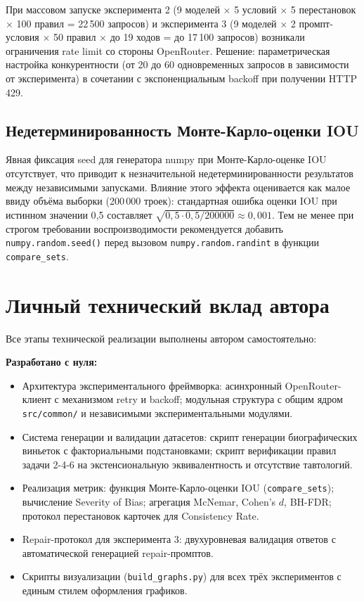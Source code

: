 При массовом запуске эксперимента 2 (9 моделей $\times$ 5 условий $\times$ 5 перестановок $\times$ 100 правил = 22\,500 запросов) и эксперимента 3 (9 моделей $\times$ 2 промпт-условия $\times$ 50 правил $\times$ до 19 ходов = до 17\,100 запросов) возникали ограничения rate limit со стороны OpenRouter. Решение: параметрическая настройка конкурентности (от 20 до 60 одновременных запросов в зависимости от эксперимента) в сочетании с экспоненциальным backoff при получении HTTP 429.

\subsection{Недетерминированность Монте-Карло-оценки IOU}

Явная фиксация seed для генератора numpy при Монте-Карло-оценке IOU отсутствует, что приводит к незначительной недетерминированности результатов между независимыми запусками. Влияние этого эффекта оценивается как малое ввиду объёма выборки (200\,000 троек): стандартная ошибка оценки IOU при истинном значении 0{,}5 составляет $\sqrt{0{,}5 \cdot 0{,}5 / 200000} \approx 0{,}001$. Тем не менее при строгом требовании воспроизводимости рекомендуется добавить \texttt{numpy.random.seed()} перед вызовом \texttt{numpy.random.randint} в функции \texttt{compare\_sets}.

\section{Личный технический вклад автора}

Все этапы технической реализации выполнены автором самостоятельно:

\textbf{Разработано с нуля:}
\begin{itemize}
  \item Архитектура экспериментального фреймворка: асинхронный OpenRouter-клиент с механизмом retry и backoff; модульная структура с общим ядром \texttt{src/common/} и независимыми экспериментальными модулями.
  \item Система генерации и валидации датасетов: скрипт генерации биографических виньеток с факториальными подстановками; скрипт верификации правил задачи 2-4-6 на экстенсиональную эквивалентность и отсутствие тавтологий.
  \item Реализация метрик: функция Монте-Карло-оценки IOU (\texttt{compare\_sets}); вычисление Severity of Bias; агрегация McNemar, Cohen's $d$, BH-FDR; протокол перестановок карточек для Consistency Rate.
  \item Repair-протокол для эксперимента 3: двухуровневая валидация ответов с автоматической генерацией repair-промптов.
  \item Скрипты визуализации (\texttt{build\_graphs.py}) для всех трёх экспериментов с единым стилем оформления графиков.
\end{itemize}

